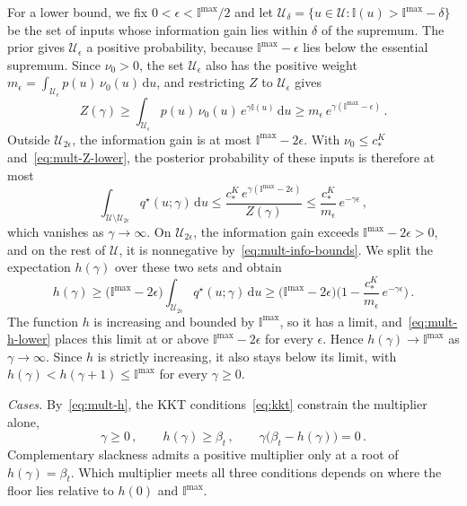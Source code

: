 \documentclass{l4dc2027}
\def\rmd{\mathrm{d}}
\def\cU{\mathcal{U}}
\newenvironment{proofof}[1]{\par\noindent{\bfseries\upshape Proof of #1\ }}{\jmlrQED}
\begin{document}
\begin{proofof}{Lemma~\ref{lem:multiplier}}
For a lower bound, we fix $0 < \epsilon < \mathbb{I}^{\max}/2$ and let $\cU_\delta = \{u \in \cU : \mathbb{I}(u) > \mathbb{I}^{\max} - \delta\}$ be the set of inputs whose information gain lies within $\delta$ of the supremum. The prior gives $\cU_\epsilon$ a positive probability, because $\mathbb{I}^{\max} - \epsilon$ lies below the essential supremum. Since $\nu_0 > 0$, the set $\cU_\epsilon$ also has the positive weight $m_\epsilon = \int_{\cU_\epsilon} p(u)\, \nu_0(u)\, \rmd u$, and restricting $Z$ to $\cU_\epsilon$ gives
\begin{equation}\label{eq:mult-Z-lower}
	Z(\gamma) \geq \int_{\cU_\epsilon} p(u)\, \nu_0(u)\, e^{\gamma \mathbb{I}(u)}\, \rmd u \geq m_\epsilon\, e^{\gamma (\mathbb{I}^{\max} - \epsilon)} \, .
\end{equation}
Outside $\cU_{2\epsilon}$, the information gain is at most $\mathbb{I}^{\max} - 2\epsilon$. With $\nu_0 \leq c_*^K$ and~\eqref{eq:mult-Z-lower}, the posterior probability of these inputs is therefore at most
\begin{equation}\label{eq:mult-tail}
	\int_{\cU \setminus \cU_{2\epsilon}} q^\star(u; \gamma)\, \rmd u \leq \frac{c_*^K\, e^{\gamma (\mathbb{I}^{\max} - 2\epsilon)}}{Z(\gamma)} \leq \frac{c_*^K}{m_\epsilon}\, e^{-\gamma \epsilon} \, ,
\end{equation}
which vanishes as $\gamma \to \infty$. On $\cU_{2\epsilon}$, the information gain exceeds $\mathbb{I}^{\max} - 2\epsilon > 0$, and on the rest of $\cU$, it is nonnegative by~\eqref{eq:mult-info-bounds}. We split the expectation $h(\gamma)$ over these two sets and obtain
\begin{equation}\label{eq:mult-h-lower}
	h(\gamma) \geq \big( \mathbb{I}^{\max} - 2\epsilon \big) \int_{\cU_{2\epsilon}} q^\star(u; \gamma)\, \rmd u \geq \big( \mathbb{I}^{\max} - 2\epsilon \big) \Big( 1 - \frac{c_*^K}{m_\epsilon}\, e^{-\gamma \epsilon} \Big) \, .
\end{equation}
The function $h$ is increasing and bounded by $\mathbb{I}^{\max}$, so it has a limit, and~\eqref{eq:mult-h-lower} places this limit at or above $\mathbb{I}^{\max} - 2\epsilon$ for every $\epsilon$. Hence $h(\gamma) \to \mathbb{I}^{\max}$ as $\gamma \to \infty$. Since $h$ is strictly increasing, it also stays below its limit, with $h(\gamma) < h(\gamma + 1) \leq \mathbb{I}^{\max}$ for every $\gamma \geq 0$.

\emph{Cases.} By~\eqref{eq:mult-h}, the KKT conditions~\eqref{eq:kkt} constrain the multiplier alone,
\begin{equation}\label{eq:mult-kkt}
	\gamma \geq 0 \, , \qquad h(\gamma) \geq \beta_t \, , \qquad \gamma \big( \beta_t - h(\gamma) \big) = 0 \, .
\end{equation}
Complementary slackness admits a positive multiplier only at a root of $h(\gamma) = \beta_t$. Which multiplier meets all three conditions depends on where the floor lies relative to $h(0)$ and $\mathbb{I}^{\max}$.


\end{proofof}
\end{document}
